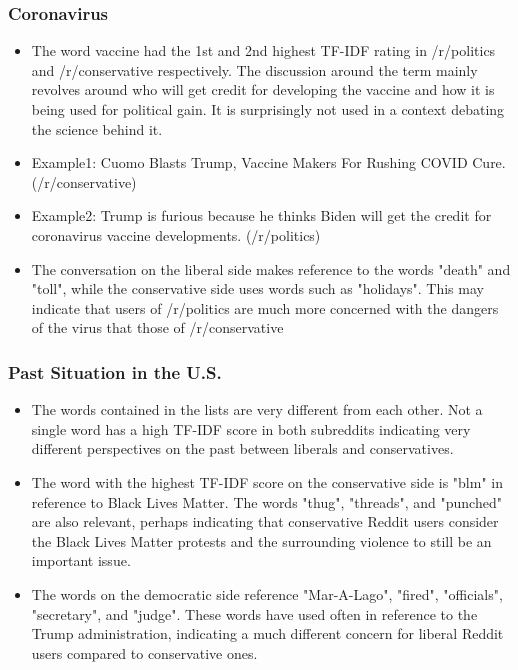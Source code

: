 \documentclass[11pt]{article}
\begin{document}
\subsubsection*{Coronavirus}
\begin{itemize}
    \item The word vaccine had the 1st and 2nd highest TF-IDF rating in /r/politics and /r/conservative respectively. The discussion around the term mainly revolves around who will get credit for developing the vaccine and how it is being used for political gain. It is surprisingly not used in a context debating the science behind it.
    \item Example1: Cuomo Blasts Trump, Vaccine Makers For Rushing COVID Cure.(/r/conservative)
    \item Example2: Trump is furious because he thinks Biden will get the credit for coronavirus vaccine developments. (/r/politics)
    \item The conversation on the liberal side makes reference to the words "death" and "toll", while the conservative side uses words such as "holidays". This may indicate that users of /r/politics are much more concerned with the dangers of the virus that those of /r/conservative
\end{itemize}
\subsubsection*{Past Situation in the U.S.}
\begin{itemize}
    \item The words contained in the lists are very different from each other. Not a single word has a high TF-IDF score in both subreddits indicating very different perspectives on the past between liberals and conservatives.
    \item The word with the highest TF-IDF score on the conservative side is "blm" in reference to Black Lives Matter. The words "thug", "threads", and "punched" are also relevant, perhaps indicating that conservative Reddit users consider the Black Lives Matter protests and the surrounding violence to still be an important issue.
    \item The words on the democratic side reference "Mar-A-Lago", "fired", "officials", "secretary", and "judge". These words have used often in reference to the Trump administration, indicating a much different concern for liberal Reddit users compared to conservative ones.
\end{itemize}
\end{document}
